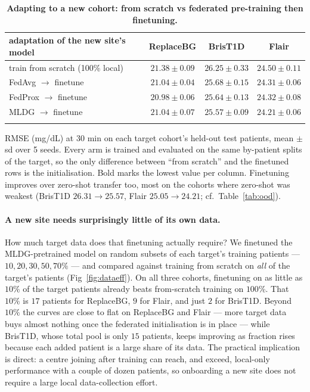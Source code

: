 \documentclass[10pt,letterpaper]{article}
\newlength\savedwidth
\newcommand\thickhline{\noalign{\global\savedwidth\arrayrulewidth\global\arrayrulewidth 2pt}%
\hline
\noalign{\global\arrayrulewidth\savedwidth}}
\begin{document}
\begin{table}[!ht]
\centering
\captionsetup{justification=centering,singlelinecheck=on}
\caption{\bf Adapting to a new cohort: from scratch vs federated pre-training then finetuning.}
\label{tab:finetune}
\begin{tabular}{lccc}
\thickhline
adaptation of the new site's model & ReplaceBG & BrisT1D & Flair \\
\hline
train from scratch (100\% local) & $21.38 \pm 0.09$ & $26.25 \pm 0.33$ & $24.50 \pm 0.11$ \\
\hline
FedAvg $\rightarrow$ finetune  & $21.04 \pm 0.04$ & $25.68 \pm 0.15$ & $24.31 \pm 0.06$ \\
FedProx $\rightarrow$ finetune & $\mathbf{20.98 \pm 0.06}$ & $25.64 \pm 0.13$ & $24.32 \pm 0.08$ \\
MLDG $\rightarrow$ finetune    & $21.04 \pm 0.07$ & $\mathbf{25.57 \pm 0.09}$ & $\mathbf{24.21 \pm 0.06}$ \\
\thickhline
\end{tabular}
\begin{center}
{\small RMSE (mg/dL) at 30 min on each target cohort's held-out test patients,
mean $\pm$ sd over 5 seeds. Every arm is trained and evaluated on the same
by-patient splits of the target, so the only difference between ``from scratch''
and the finetuned rows is the initialisation. Bold marks the lowest value per
column. Finetuning improves over zero-shot transfer too, most on the cohorts where
zero-shot was weakest (BrisT1D $26.31\rightarrow25.57$, Flair
$25.05\rightarrow24.21$; cf.\ Table~\ref{tab:ood}).}
\end{center}
\end{table}

\paragraph{A new site needs surprisingly little of its own data.} How much
target data does that finetuning actually require? We finetuned the
MLDG-pretrained model on random subsets of each target's training patients ---
$10, 20, 30, 50, 70\%$ --- and compared against training from scratch on
\emph{all} of the target's patients (Fig~\ref{fig:dataeff}). On all three cohorts,
finetuning on as little as $10\%$ of the target patients already beats
from-scratch training on $100\%$. That $10\%$ is $17$ patients for ReplaceBG,
$9$ for Flair, and just $2$ for BrisT1D.
Beyond $10\%$ the curves are close to flat on ReplaceBG and Flair --- more target
data buys almost nothing once the federated initialisation is in place --- while
BrisT1D, whose total pool is only $15$ patients, keeps improving as fraction rises
because each added patient is a large share of its data. The practical implication
is direct: a centre joining after training can reach, and exceed, local-only
performance with a couple of dozen patients, so onboarding a new site does not
require a large local data-collection effort.
\end{document}
